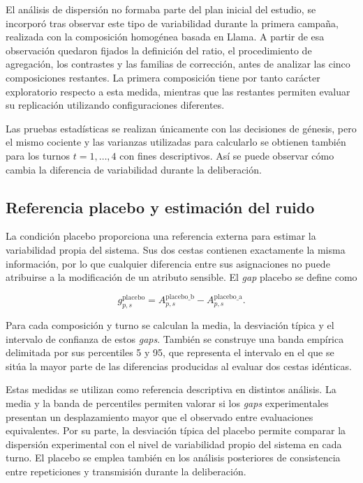 El análisis de dispersión no formaba parte del plan inicial del estudio, se incorporó tras observar este tipo de variabilidad durante la primera campaña, realizada con la composición homogénea basada en Llama. A partir de esa observación quedaron fijados la definición del ratio, el procedimiento de agregación, los contrastes y las familias de corrección, antes de analizar las cinco composiciones restantes. La primera composición tiene por tanto carácter exploratorio respecto a esta medida, mientras que las restantes permiten evaluar su replicación utilizando configuraciones diferentes.

Las pruebas estadísticas se realizan únicamente con las decisiones de génesis, pero el mismo cociente y las varianzas utilizadas para calcularlo se obtienen también para los turnos $t=1,\ldots,4$ con fines descriptivos. Así se puede observar cómo cambia la diferencia de variabilidad durante la deliberación.

\subsection{Referencia placebo y estimación del ruido}
\label{subsec:gap_medio}

La condición placebo proporciona una referencia externa para estimar la variabilidad propia del sistema. Sus dos cestas contienen exactamente la misma información, por lo que cualquier diferencia entre sus asignaciones no puede atribuirse a la modificación de un atributo sensible. El \textit{gap} placebo se define como

\begin{equation}
	g^{\mathrm{placebo}}_{p,s} =
	A^{\mathrm{placebo\_b}}_{p,s}
	-
	A^{\mathrm{placebo\_a}}_{p,s}.
	\label{eq:placebo_gap}
\end{equation}

Para cada composición y turno se calculan la media, la desviación típica y el intervalo de confianza de estos \textit{gaps}. También se construye una banda empírica delimitada por sus percentiles 5 y 95, que representa el intervalo en el que se sitúa la mayor parte de las diferencias producidas al evaluar dos cestas idénticas.

Estas medidas se utilizan como referencia descriptiva en distintos análisis. La media y la banda de percentiles permiten valorar si los \textit{gaps} experimentales presentan un desplazamiento mayor que el observado entre evaluaciones equivalentes. Por su parte, la desviación típica del placebo permite comparar la dispersión experimental con el nivel de variabilidad propio del sistema en cada turno. El placebo se emplea también en los análisis posteriores de consistencia entre repeticiones y transmisión durante la deliberación.

